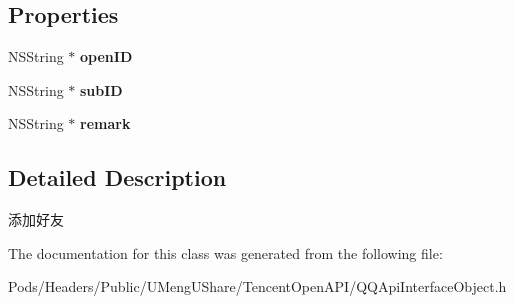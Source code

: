 \subsection*{Properties}
\begin{DoxyCompactItemize}
\item 
\mbox{\label{interface_q_q_api_add_friend_object_afd19eff3f435f8caa97108febc704052}} 
N\+S\+String $\ast$ {\bfseries open\+ID}
\item 
\mbox{\label{interface_q_q_api_add_friend_object_a27fef60800f9f495e429a57777a3e0f3}} 
N\+S\+String $\ast$ {\bfseries sub\+ID}
\item 
\mbox{\label{interface_q_q_api_add_friend_object_af0440527164d4ebfb522373335657255}} 
N\+S\+String $\ast$ {\bfseries remark}
\end{DoxyCompactItemize}


\subsection{Detailed Description}
添加好友 

The documentation for this class was generated from the following file\+:\begin{DoxyCompactItemize}
\item 
Pods/\+Headers/\+Public/\+U\+Meng\+U\+Share/\+Tencent\+Open\+A\+P\+I/Q\+Q\+Api\+Interface\+Object.\+h\end{DoxyCompactItemize}
